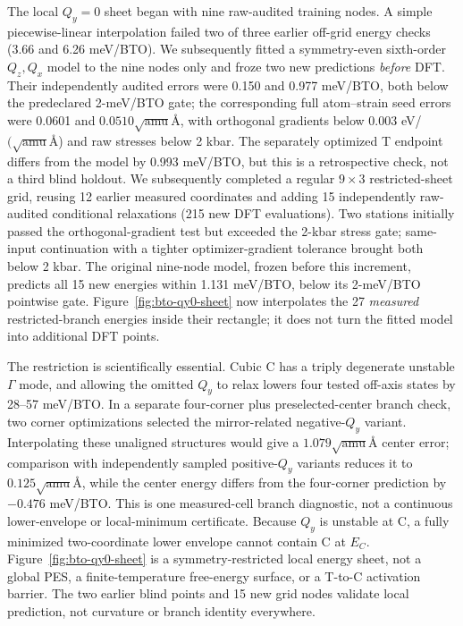 \documentclass[final,5p,times,twocolumn]{elsarticle}
\begin{document}
The local $Q_y=0$ sheet began with nine raw-audited training nodes. A simple
piecewise-linear interpolation failed two of three earlier off-grid energy
checks (3.66 and 6.26 meV/BTO). We subsequently fitted a symmetry-even
sixth-order $Q_z,Q_x$ model to the nine nodes only and froze two new predictions
\emph{before} DFT. Their independently audited errors were 0.150 and
0.977 meV/BTO, both below the predeclared 2-meV/BTO gate; the corresponding
full atom--strain seed errors were 0.0601 and
$0.0510\sqrt{\mathrm{amu}}$\AA{}, with orthogonal gradients below
$0.003$ eV/$(\sqrt{\mathrm{amu}}$\AA{}) and raw stresses below 2 kbar.
The separately optimized T endpoint differs from the model by 0.993 meV/BTO,
but this is a retrospective check, not a third blind holdout.
We subsequently completed a regular $9\times3$ restricted-sheet grid,
reusing 12 earlier measured coordinates and adding 15 independently
raw-audited conditional relaxations (215 new DFT evaluations). Two stations
initially passed the orthogonal-gradient test but exceeded the 2-kbar stress
gate; same-input continuation with a tighter optimizer-gradient tolerance
brought both below 2 kbar. The original nine-node model, frozen before this
increment, predicts all 15 new energies within 1.131 meV/BTO, below its
2-meV/BTO pointwise gate. Figure~\ref{fig:bto-qy0-sheet} now interpolates
the 27 \emph{measured} restricted-branch energies inside their rectangle;
it does not turn the fitted model into additional DFT points.

The restriction is scientifically essential. Cubic C has a triply degenerate
unstable $\Gamma$ mode, and allowing the omitted $Q_y$ to relax lowers four
tested off-axis states by 28--57 meV/BTO. In a separate four-corner plus
preselected-center branch check, two corner optimizations selected the
mirror-related negative-$Q_y$ variant. Interpolating these unaligned
structures would give a $1.079\sqrt{\mathrm{amu}}$\AA{} center error;
comparison with independently sampled positive-$Q_y$ variants reduces it to
$0.125\sqrt{\mathrm{amu}}$\AA{}, while the center energy differs from the
four-corner prediction by $-0.476$ meV/BTO. This is one measured-cell
branch diagnostic, not a continuous lower-envelope or local-minimum
certificate. Because $Q_y$ is unstable at C, a fully minimized
two-coordinate lower envelope cannot contain C at $E_C$. Figure~\ref{fig:bto-qy0-sheet} is a
symmetry-restricted local energy sheet, not a global PES, a finite-temperature
free-energy surface, or a T-to-C activation barrier. The two earlier blind
points and 15 new grid nodes validate local prediction, not curvature or
branch identity everywhere.
\end{document}
